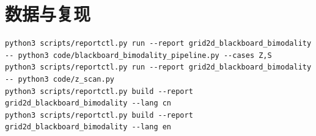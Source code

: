 \documentclass[11pt,fontset=fandol]{ctexart}
\begin{document}
\section*{数据与复现}
\begin{Verbatim}[breaklines=true,breakanywhere=true]
python3 scripts/reportctl.py run --report grid2d_blackboard_bimodality -- python3 code/blackboard_bimodality_pipeline.py --cases Z,S
python3 scripts/reportctl.py run --report grid2d_blackboard_bimodality -- python3 code/z_scan.py
python3 scripts/reportctl.py build --report grid2d_blackboard_bimodality --lang cn
python3 scripts/reportctl.py build --report grid2d_blackboard_bimodality --lang en
\end{Verbatim}
\end{document}

